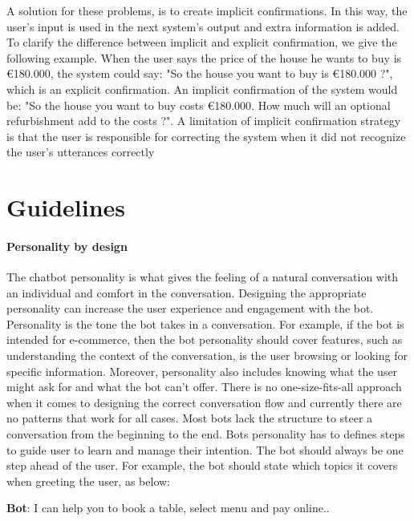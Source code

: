 A solution for these problems, is to create implicit confirmations. In this way, the user’s input is used in the next system’s output and extra information is added. To clarify the difference between implicit and explicit confirmation, we give the following example. When the user says the price of the house he wants to buy is \euro180.000, the system could say: "So the house you want to buy is \euro180.000 ?", which is an explicit confirmation. An implicit confirmation of the system would be: "So the house you want to buy costs \euro180.000. How much will an optional refurbishment add to the costs ?". A limitation of implicit confirmation strategy is that the user is responsible for correcting the system when it did not recognize the user’s utterances correctly \cite{mctear2016}



\section{Guidelines} %

\paragraph{Personality by design}
The chatbot personality is what gives the feeling of a natural conversation with an individual and comfort in the conversation. Designing the appropriate personality can increase the user experience and engagement with the bot. Personality is the tone the bot takes in a conversation. For example, if the bot is intended for e-commerce, then the bot personality should cover features, such as understanding the context of the conversation, is the user browsing or looking for specific information. Moreover, personality also includes knowing what the user might ask for and what the bot can’t offer. There is no one-size-fits-all approach when it comes to designing the correct conversation flow and currently there are no patterns that work for all cases. Most bots lack the structure to steer a conversation from the beginning to the end. Bots personality has to defines steps to guide user to learn and manage their intention. The bot should always be one step ahead of the user. For example, the bot should state which topics it covers when greeting the user, as below:
\bigskip

{ \selectfont

  \color{blue}
  \textbf{Bot}: I can help you to book a table, select menu and pay online..
  \bigskip
 
  \color{black}
}

